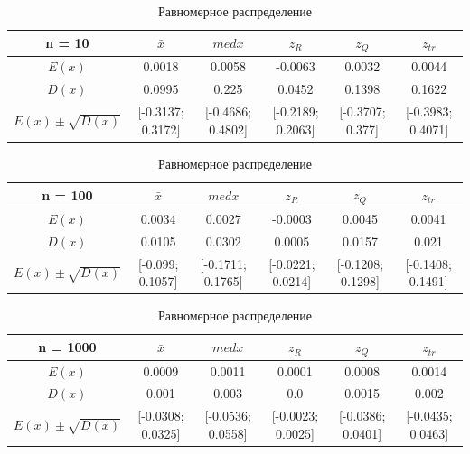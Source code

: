 \documentclass[12pt]{article}
\begin{document}
\begin{center}
\begin{table}
\caption{Равномерное распределение}
\begin{adjustbox}{width=\textwidth}
\begin{tabular}{| c | c | c | c | c | c |}
\hline
n = 10 & $\bar{x}$ & $med x$ & $z_R$ & $z_Q$ & $z_{tr}$ \\\hline
$E(x)$ & 0.0018 & 0.0058 & -0.0063 & 0.0032 & 0.0044 \\\hline
$D(x)$ & 0.0995 & 0.225 & 0.0452 & 0.1398 & 0.1622 \\\hline
$E(x) \pm \sqrt{D(x)}$ & [-0.3137; 0.3172] & [-0.4686; 0.4802] & [-0.2189; 0.2063] & [-0.3707; 0.377] & [-0.3983; 0.4071]\\\hline
\end{tabular}
\end{adjustbox}

\begin{adjustbox}{width=\textwidth}
\begin{tabular}{| c | c | c | c | c | c |}
\hline
n = 100 & $\bar{x}$ & $med x$ & $z_R$ & $z_Q$ & $z_{tr}$ \\\hline
$E(x)$ & 0.0034 & 0.0027 & -0.0003 & 0.0045 & 0.0041 \\\hline
$D(x)$ & 0.0105 & 0.0302 & 0.0005 & 0.0157 & 0.021 \\\hline
$E(x) \pm \sqrt{D(x)}$ & [-0.099; 0.1057] & [-0.1711; 0.1765] & [-0.0221; 0.0214] & [-0.1208; 0.1298] & [-0.1408; 0.1491]\\\hline
\end{tabular}
\end{adjustbox}

\begin{adjustbox}{width=\textwidth}
\begin{tabular}{| c | c | c | c | c | c |}
\hline
n = 1000 & $\bar{x}$ & $med x$ & $z_R$ & $z_Q$ & $z_{tr}$ \\\hline
$E(x)$ & 0.0009 & 0.0011 & 0.0001 & 0.0008 & 0.0014 \\\hline
$D(x)$ & 0.001 & 0.003 & 0.0 & 0.0015 & 0.002 \\\hline
$E(x) \pm \sqrt{D(x)}$ & [-0.0308; 0.0325] & [-0.0536; 0.0558] & [-0.0023; 0.0025] & [-0.0386; 0.0401] & [-0.0435; 0.0463]\\\hline
\end{tabular}
\end{adjustbox}

\end{table}
\end{center}
\end{document}
